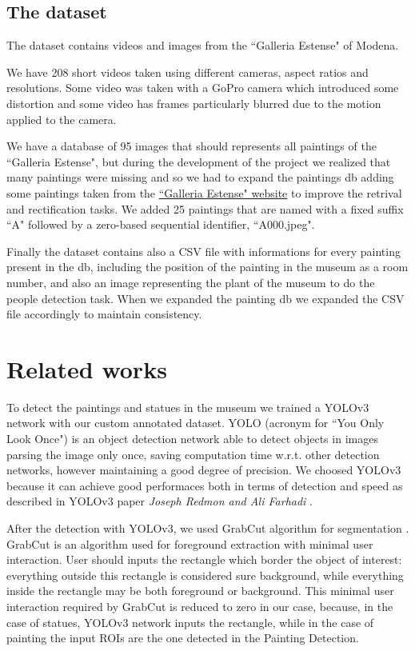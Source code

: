 \documentclass[10pt,twocolumn,letterpaper]{article}
\begin{document}
\subsection{The dataset}

The dataset contains videos and images from the ``Galleria Estense" of Modena.

We have 208 short videos taken using different cameras, aspect ratios and resolutions. 
Some video was taken with a GoPro camera which introduced some distortion and
some video has frames particularly blurred due to the motion applied to the camera.

We have a database of 95 images that should represents all paintings of the ``Galleria Estense", 
but during the development of the project we realized that many paintings were missing 
and so we had to expand the paintings db adding some paintings taken from the \href{https://www.gallerie-estensi.beniculturali.it/opere/#c-dipinti#c-sculture#l-galleria-estense}{``Galleria Estense" website} to improve the retrival and rectification tasks. We added 25 paintings that are named 
with a fixed suffix ``A" followed by a zero-based sequential identifier, \eg ``A000.jpeg".

Finally the dataset contains also a CSV file with informations for every painting present
in the db, including the position of the painting in the museum as a room number, and also an image
representing the plant of the museum to do the people detection task. When we expanded the 
painting db we expanded the CSV file accordingly to maintain consistency.

\section{Related works}

To detect the paintings and statues in the museum we trained a YOLOv3 network with
our custom annotated dataset. YOLO (acronym for ``You Only Look Once") is an object detection
network able to detect objects in images parsing the image only once, saving computation time w.r.t. 
other detection networks, however maintaining a good degree of precision.
We choosed YOLOv3 because it can achieve good performaces
both in terms of detection and speed as described in YOLOv3 paper \textit{Joseph Redmon and Ali Farhadi} \cite{yolov3}.

After the detection with YOLOv3, we used GrabCut algorithm for segmentation \cite{grabcut}.
GrabCut is an algorithm used for foreground extraction with minimal user interaction.
User should inputs the rectangle which border the object of interest: everything outside this rectangle is considered sure background, while everything inside the rectangle may be both foreground or background.
This minimal user interaction required by GrabCut is reduced to zero in our case, because, in the case of statues, YOLOv3 network inputs the rectangle, while in the case of painting the input ROIs are the one detected in the Painting Detection.
\end{document}
